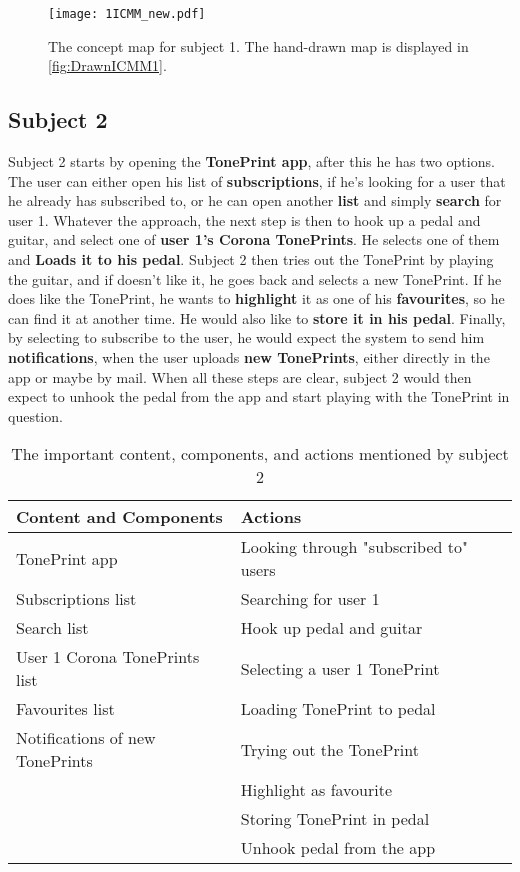 %
\begin{figure}[H]
	\centering
	\texttt{[image: 1ICMM\_new.pdf]}
	\caption{The concept map for subject 1. The hand-drawn map is displayed in \autoref{fig:DrawnICMM1}.}
	\label{fig:ICMM1}
\end{figure}


\subsection*{Subject 2}
\label{Subject2}
Subject 2 starts by opening the \textbf{TonePrint app}, after this he has two options. The user can either open his list of \textbf{subscriptions}, if he's looking for a user that he already has subscribed to, or he can open another \textbf{list} and simply \textbf{search} for user 1. Whatever the approach, the next step is then to hook up a pedal and guitar, and select one of \textbf{user 1's Corona TonePrints}. He selects one of them and \textbf{Loads it to his pedal}. Subject 2 then tries out the TonePrint by playing the guitar, and if doesn't like it, he goes back and selects a new TonePrint. If he does like the TonePrint, he wants to \textbf{highlight} it as one of his \textbf{favourites}, so he can find it at another time. He would also like to \textbf{store it in his pedal}. Finally, by selecting to subscribe to the user, he would expect the system to send him \textbf{notifications}, when the user uploads \textbf{new TonePrints}, either directly in the app or maybe by mail. When all these steps are clear, subject 2 would then expect to unhook the pedal from the app and start playing with the TonePrint in question. \\
%
\begin{table}[H]
\begin{minipage}[b]{\linewidth}\centering
	\begin{tabular} {|l|l|l|} \hline
		\rowcolor{xGray25} \textbf{Content and Components} & \textbf{Actions} \\  \hline
		TonePrint app & Looking through "subscribed to" users \\
		Subscriptions list & Searching for user 1 \\
		Search list & Hook up pedal and guitar \\
		User 1 Corona TonePrints list & Selecting a user 1 TonePrint \\
		Favourites list & Loading TonePrint to pedal \\
		Notifications of new TonePrints & Trying out the TonePrint \\
		 & Highlight as favourite \\
		 & Storing TonePrint in pedal \\
		 & Unhook pedal from the app \\ \hline
	\end{tabular}
	\caption{The important content, components, and actions mentioned by subject 2}
	\label{tab:Subject2ContentActions}
\end{minipage}
\end{table}
